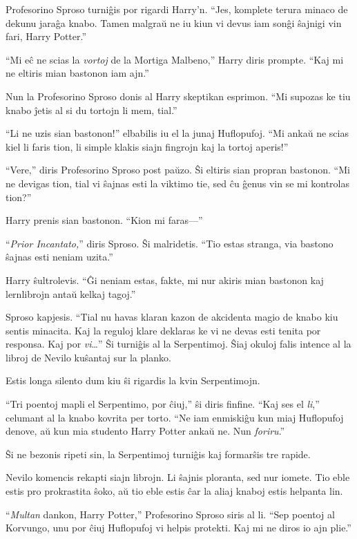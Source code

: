 Profesorino Sproso turniĝis por rigardi Harry'n. ``Jes, komplete
terura minaco de dekunu jaraĝa knabo. Tamen malgraŭ ne iu kiun vi
devus iam sonĝi ŝajnigi vin fari, Harry Potter.''

``Mi eĉ ne scias la \emph{vortoj} de la Mortiga Malbeno,'' Harry diris
prompte. ``Kaj mi ne eltiris mian bastonon iam ajn.''

Nun la Profesorino Sproso donis al Harry skeptikan esprimon. ``Mi
supozas ke tiu knabo ĵetis al si du tortojn li mem, tial.''

``Li ne uzis sian bastonon!'' elbabilis iu el la junaj
Huflopufoj. ``Mi ankaŭ ne scias kiel li faris tion, li simple klakis
siajn fingrojn kaj la tortoj aperis!''

``Vere,'' diris Profesorino Sproso post paŭzo. Ŝi eltiris sian propran
bastonon. ``Mi ne devigas tion, tial vi ŝajnas esti la viktimo tie,
sed ĉu ĝenus vin se mi kontrolas tion?''

Harry prenis sian bastonon. ``Kion mi faras—''

``\emph{Prior Incantato,}'' diris Sproso. Ŝi malridetis. ``Tio estas
stranga, via bastono ŝajnas esti neniam uzita.''

Harry ŝultrolevis. ``Ĝi neniam estas, fakte, mi nur akiris mian
bastonon kaj lernlibrojn antaŭ kelkaj tagoj.''

Sproso kapjesis. ``Tial nu havas klaran kazon de akcidenta magio de
knabo kiu sentis minacita. Kaj la reguloj klare deklaras ke vi ne
devas esti tenita por responsa. Kaj por \emph{vi}\ldots'' Ŝi turniĝis
al la Serpentimoj. Ŝiaj okuloj falis intence al la libroj de Nevilo
kuŝantaj sur la planko.

Estis longa silento dum kiu ŝi rigardis la kvin Serpentimojn.

``Tri poentoj mapli el Serpentimo, por ĉiuj,'' ŝi diris
finfine. ``Kaj ses el \emph{li},'' celumant al la knabo kovrita per
torto.  ``Ne iam enmiskiĝu kun miaj Huflopufoj denove, aŭ kun mia
studento Harry Potter ankaŭ ne. Nun \emph{foriru}.''

Ŝi ne bezonis ripeti sin, la Serpentimoj turniĝis kaj formarŝis tre rapide.

Nevilo komencis rekapti siajn librojn. Li ŝajnis ploranta, sed nur
iomete. Tio eble estis pro prokrastita ŝoko, aŭ tio eble estis ĉar la
aliaj knaboj estis helpanta lin.

``\emph{Multan} dankon, Harry Potter,'' Profesorino Sproso siris al
li. ``Sep poentoj al Korvungo, unu por ĉiuj Huflopufoj vi helpis
protekti. Kaj mi ne diros io ajn plie.''

